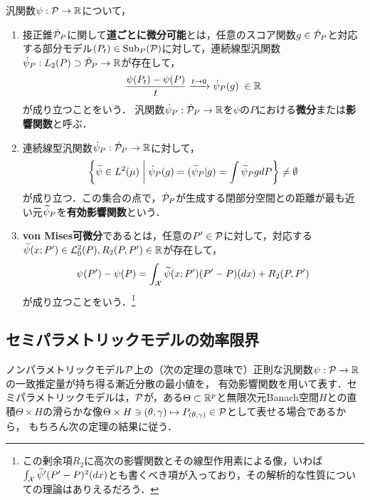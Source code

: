 \documentclass[uplatex, dvipdfmx]{jsarticle}
\newcommand{\Sub}{\mathrm{Sub}}
\begin{document}
\begin{definition}\label{def-differentiability-of-functional}
    汎関数$\psi:\P\to\R$について，
    \begin{enumerate}
        \item 接正錐$\dot{\P}_P$に関して\textbf{道ごとに微分可能}とは，任意のスコア関数$g\in\dot{\P}_P$と対応する部分モデル$(P_t)\in\Sub_P(\P)$に対して，連続線型汎関数$\dot{\psi}_P:L_2(P)\supset\dot{\P}_P\to\R$が存在して，
        \[\frac{\psi(P_t)-\psi(P)}{t}\xrightarrow{t\to0}\dot{\psi}_P(g)\;\in\R\]
        が成り立つことをいう．
        汎関数$\dot{\psi}_P:\dot{\P}_P\to\R$を$\psi$の$P$における\textbf{微分}または\textbf{影響関数}と呼ぶ．
        \item 連続線型汎関数$\dot{\psi}_P:\dot{\P}_P\to\R$に対して，
        \[\Brace{\wt{\psi}\in L^2(\mu)\;\middle|\;\dot{\psi}_P(g)=(\wt{\psi}_P|g)=\int\wt{\psi}_PgdP}\ne\emptyset\]
        が成り立つ．この集合の点で，$\dot{\P}_P$が生成する閉部分空間との距離が最も近い元$\wt{\psi}_P$を\textbf{有効影響関数}という．
        \item \textbf{von Mises可微分}であるとは，任意の$P'\in\P$に対して，対応する$\wt{\psi}(x;P')\in\L^2_0(P),R_2(P,P')\in\R$が存在して，
        \[\psi(P')-\psi(P)=\int_\X\wt{\psi}(x;P')(P'-P)(dx)+R_2(P,P')\]
        が成り立つことをいう．\footnote{この剰余項$R_2$に高次の影響関数とその線型作用素による像，いわば$\int_\X\wt{\psi}'(P'-P)^2(dx)$とも書くべき項が入っており，その解析的な性質についての理論はありえるだろう．}
    \end{enumerate}
\end{definition}


\subsection{セミパラメトリックモデルの効率限界}

\begin{tcolorbox}[colframe=ForestGreen, colback=ForestGreen!10!white,breakable,colbacktitle=ForestGreen!40!white,coltitle=black,fonttitle=\bfseries\sffamily,
title=]
    ノンパラメトリックモデル$\P$上の（次の定理の意味で）正則な汎関数$\psi:\P\to\R$の一致推定量が持ち得る漸近分散の最小値を，
    有効影響関数を用いて表す．セミパラメトリックモデルは，$\P$が，ある$\Theta\subset\R^p$と無限次元Banach空間$H$との直積$\Theta\times H$の滑らかな像$\Theta\times H\ni (\theta,\gamma)\mapsto P_{(\theta,\gamma)}\in\P$として表せる場合であるから，
    もちろん次の定理の結果に従う．
\end{tcolorbox}
\end{document}
